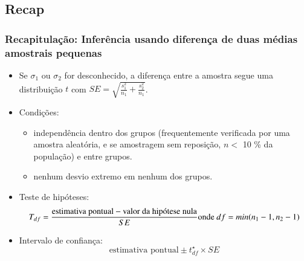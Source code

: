 \subsection{Recap}


\begin{frame}
\frametitle{Recapitulação: Inferência usando diferença de duas médias amostrais pequenas}
\small
\begin{itemize}
\justifying
\item Se $ \sigma_1 $ ou $ \sigma_2 $ for desconhecido, a diferença entre a amostra segue uma distribuição $t$ com $SE = \sqrt{ \frac{s_1^2}{n_1} + \frac{s_2^2}{n_1} }$.

\pause
\justifying
\item Condições: 
\begin{itemize}
\justifying
\item independência dentro dos grupos (frequentemente verificada por uma amostra aleatória, e se amostragem sem reposição, $ n <$ 10 \% da população) e entre grupos.
\justifying
\item nenhum desvio extremo em nenhum dos grupos.
\end{itemize}

\pause
\justifying
\item Teste de hipóteses: 
\[ T_{df} = \frac{\text{estimativa pontual} - \text{valor da hipótese nula}}{SE}\\\text{onde }df = min(n_1 - 1, n_2 - 1) \]

\pause
\justifying
\item Intervalo de confiança:
\[ \text{estimativa pontual} \pm t_{df}^\star \times SE \]

\end{itemize}

\end{frame}


